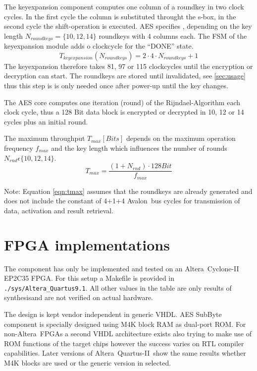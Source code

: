 \documentclass{ruschidoc}
\begin{document}
The keyexpansion component computes one column of a roundkey in two clock cycles. In
the first cycle the column is substituted throught the s-box, in the second cycle the
shift-operation is executed. AES specifies \cite{NIST:Fips197}, depending on the key length $ N_{roundkeys}=\{10,12,14\} $
roundkeys with 4 columns each. The \gls{FSM} of the keyexpansion module adds o clockcycle for the ``DONE'' state. 
\begin{equation}
  T_{keyexpansion}(N_{roundkeys}) = 2 \cdot 4 \cdot N_{roundkeys} +1 
\label{eqn:keyexp}
\end{equation}
The keyexpansion therefore takes 81, 97 or 115 clockcycles until the encryption or decryption can start. The
roundkeys are stored until invalidated, see \ref{sec:usage} thus this step is is only needed once after power-up until the key changes.

The AES core computes one iteration (round) of the Rijndael-Algorithm each clock cycle, thus a 128 Bit data block is
encrypted or decrypted in 10, 12 or 14 cycles plus an initial round.

The maximum throughput $T_{max}[Bits]$ depends on the maximum operation frequency $f_{max}$ and the key length which
influences the number of rounds $N_{rnd} \epsilon \lbrace 10,12,14 \rbrace $.
\begin{equation}
  T_{max}=\frac{ (1+N_{rnd}) \cdot 128 Bit}{f_{max}} 
\label{eqn:tmax}
\end{equation}

Note: Equation \ref{eqn:tmax} assumes that the roundkeys are already generated and does not include the constant of 4+1+4
Avalon\rtm\ bus cycles for transmission of data, activation and result retrieval.
\newpage
\section{FPGA implementations}
\label{sec:fpga}
The component has only be implemented and tested on an Altera\rtm\ Cyclone-II EP2C35
FPGA. For this setup a Makefile is provided in \texttt{./sys/Altera\_Quartus9.1}.  All
other values in the table are only results of synthesis\footnotemark[0] and are not
verified on actual hardware.


The design is kept vendor independent in generic VHDL. 
AES SubByte component is specially designed using M4K block RAM as dual-port ROM. For
non-Altera\rtm\ FPGAs a second VHDL architecture exists also trying to make use of
ROM functions of the target chips however the success varies on RTL compiler
capabilities. Later versions of  Altera\rtm\ Quartus-II\rtm\ show the same results whether M4K blocks are used or the generic version in selected.
\end{document}
